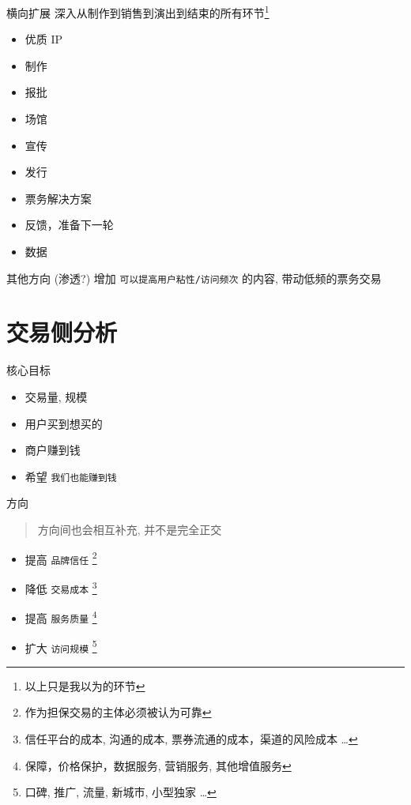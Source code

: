 \documentclass[presentation,bigger]{beamer}
\begin{document}
\begin{frame}[label={sec:org41890f1}]{横向扩展}
深入从制作到销售到演出到结束的所有环节\footnote{以上只是我以为的环节}

\begin{itemize}
\item 优质 IP
\item 制作
\item 报批
\item 场馆
\item 宣传
\item 发行
\item 票务解决方案
\item 反馈，准备下一轮
\item 数据
\end{itemize}
\end{frame}

\begin{frame}[fragile,label={sec:orge188f05}]{其他方向 (渗透?)}
 增加 \texttt{可以提高用户粘性/访问频次} 的内容, 带动低频的票务交易
\end{frame}

\section{交易侧分析}
\label{sec:orge69639f}

\begin{frame}[fragile,label={sec:org34ae129}]{核心目标}
 \begin{itemize}
\item 交易量, 规模
\item 用户买到想买的
\item 商户赚到钱
\item 希望 \texttt{我们也能赚到钱}
\end{itemize}
\end{frame}

\begin{frame}[fragile,label={sec:org1f570da}]{方向}
 \begin{quote}
方向间也会相互补充, 并不是完全正交
\end{quote}
\begin{itemize}
\item 提高 \texttt{品牌信任} \footnote{作为担保交易的主体必须被认为可靠}
\item 降低 \texttt{交易成本} \footnote{信任平台的成本, 沟通的成本, 票券流通的成本，渠道的风险成本 \dots{}}
\item 提高 \texttt{服务质量} \footnote{保障，价格保护，数据服务, 营销服务, 其他增值服务}
\item 扩大 \texttt{访问规模} \footnote{口碑, 推广, 流量, 新城市, 小型独家 \dots{}}
\end{itemize}
\end{frame}
\end{document}
